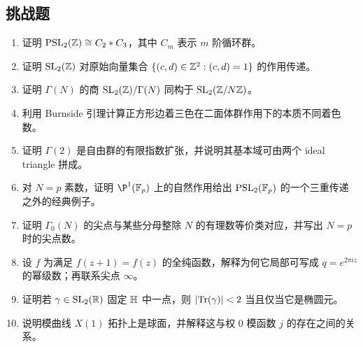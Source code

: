 \subsection*{挑战题}
\begin{enumerate}[resume, label=\textbf{\arabic*.}, leftmargin=*, itemsep=0.5em]
\item \hard 证明 $\mathrm{PSL}_2(\mathbb{Z})\cong C_2*C_3$，其中 $C_m$ 表示 $m$ 阶循环群。
\item \hard 证明 $\mathrm{SL}_2(\mathbb{Z})$ 对原始向量集合 $\{(c,d)\in\mathbb{Z}^2:(c,d)=1\}$ 的作用传递。
\item \hard 证明 $\Gamma(N)$ 的商 $\mathrm{SL}_2(\mathbb{Z})/\Gamma(N)$ 同构于 $\mathrm{SL}_2(\mathbb{Z}/N\mathbb{Z})$。
\item \hard 利用 Burnside 引理计算正方形边着三色在二面体群作用下的本质不同着色数。
\item \hard 证明 $\Gamma(2)$ 是自由群的有限指数扩张，并说明其基本域可由两个 ideal triangle 拼成。
\item \hard 对 $N=p$ 素数，证明 $\P^1(\F_p)$ 上的自然作用给出 $\mathrm{PSL}_2(\mathbb{F}_p)$ 的一个三重传递之外的经典例子。
\item \hard 证明 $\Gamma_0(N)$ 的尖点与某些分母整除 $N$ 的有理数等价类对应，并写出 $N=p$ 时的尖点数。
\item \hard 设 $f$ 为满足 $f(z+1)=f(z)$ 的全纯函数，解释为何它局部可写成 $q=e^{2\pi iz}$ 的幂级数；再联系尖点 $\infty$。
\item \hard 证明若 $\gamma\in\mathrm{SL}_2(\mathbb{R})$ 固定 $\mathbb{H}$ 中一点，则 $|\mathrm{Tr}(\gamma)|<2$ 当且仅当它是椭圆元。
\item \hard 说明模曲线 $X(1)$ 拓扑上是球面，并解释这与权 $0$ 模函数 $j$ 的存在之间的关系。
\end{enumerate}
